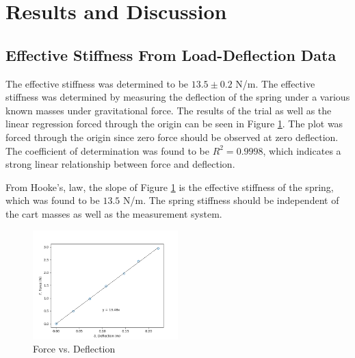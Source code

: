 \section{Results and Discussion}
\subsection{Effective Stiffness From Load-Deflection Data}
The effective stiffness was determined to be $13.5 \pm 0.2$ N/m. The effective stiffness was determined by measuring the deflection of the spring under a various known masses under gravitational force. The results of the trial as well as the linear regression forced through the origin can be seen in Figure \ref{fig:Force vs. Deflection}. The plot was forced through the origin since zero force should be observed at zero deflection. The coefficient of determination was found to be $R^2 = 0.9998$, which indicates a strong linear relationship between force and deflection.

From Hooke's, law, the slope of Figure \ref{fig:Force vs. Deflection} is the effective stiffness of the spring, which was found to be $13.5$ N/m. The spring stiffness should be independent of the cart masses as well as the measurement system. 
\begin{figure}[H]
    \centering
    \includegraphics[width=0.5\textwidth]{matplotlib/force vs deflection.png}
    \caption{Force vs. Deflection}
    \label{fig:Force vs. Deflection}
\end{figure}

